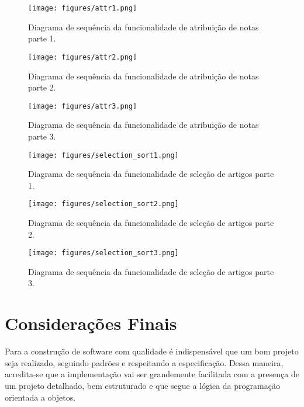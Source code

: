 \documentclass[a4paper, 12pt]{article}
\begin{document}

\begin{figure}[!f] 
\centering
\texttt{[image: figures/attr1.png]}
\caption{Diagrama de sequência da funcionalidade de atribuição de notas parte 1.}
\label{fig:attr1}
\end{figure}

\begin{figure}[!f] 
\centering
\texttt{[image: figures/attr2.png]}
\caption{Diagrama de sequência da funcionalidade de atribuição de notas parte 2.}
\label{fig:attr2}
\end{figure}

\begin{figure}[!f] 
\centering
\texttt{[image: figures/attr3.png]}
\caption{Diagrama de sequência da funcionalidade de atribuição de notas parte 3.}
\label{fig:attr3}
\end{figure}


\begin{figure}[!f] 
\centering
\texttt{[image: figures/selection\_sort1.png]}
\caption{Diagrama de sequência da funcionalidade de seleção de artigos parte 1.}
\label{fig:selection_sort1}
\end{figure}

\begin{figure}[!f] 
\centering
\texttt{[image: figures/selection\_sort2.png]}
\caption{Diagrama de sequência da funcionalidade de seleção de artigos parte 2.}
\label{fig:selection_sort2}
\end{figure}

\begin{figure}[!f] 
\centering
\texttt{[image: figures/selection\_sort3.png]}
\caption{Diagrama de sequência da funcionalidade de seleção de artigos parte 3.}
\label{fig:selection_sort3}
\end{figure}

\FloatBarrier

\section{Considerações Finais}

	Para a construção de software com qualidade é indispensável que um bom projeto seja realizado, seguindo padrões e respeitando a especificação. Dessa maneira, acredita-se que a implementação vai ser grandemente facilitada com a presença de um projeto detalhado, bem estruturado e que segue a lógica da programação orientada a objetos.
\end{document}
